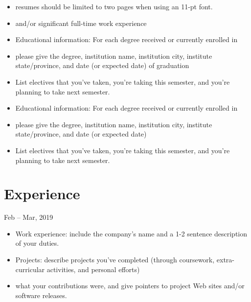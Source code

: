 \documentclass{resume}
\begin{document}
\begin{itemize}[label={-}]
  \item resumes should be limited to two pages when using an 11-pt font.
  \item and/or significant full-time work experience
\end{itemize}

\begin{itemize}[label={-}]
  \item Educational information: For each degree received or currently enrolled in
  \item please give the degree, institution name, institution city, institute state/province, and date (or expected date) of graduation
  \item List electives that you've taken, you're taking this semester, and you're planning to take next semester. 
\end{itemize}

\begin{itemize}[label={-}]
  \item Educational information: For each degree received or currently enrolled in
  \item please give the degree, institution name, institution city, institute state/province, and date (or expected date)
  \item List electives that you've taken, you're taking this semester, and you're planning to take next semester. 
\end{itemize}





\section{ Experience}
 {} {Feb -- Mar, 2019}
\begin{itemize}
  \item Work experience: include the company's name and a 1-2 sentence description of your duties.
  \item Projects: describe projects you've completed (through coursework, extra-curricular activities, and personal efforts)
  \item what your contributions were, and give pointers to project Web sites and/or software releases.
\end{itemize}
\end{document}
